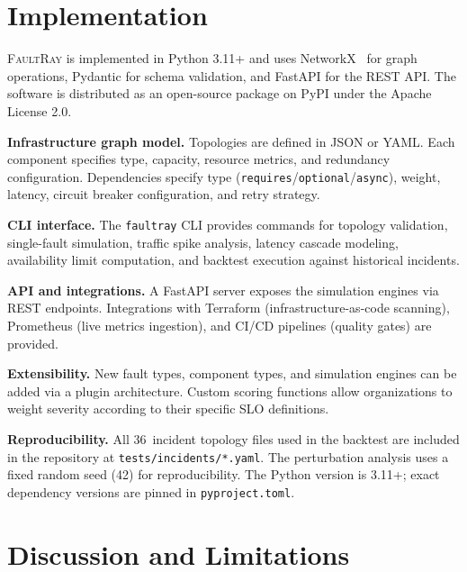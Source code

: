 \documentclass[10pt,twocolumn]{article}
\begin{document}
\section{Implementation}\label{sec:impl}

\textsc{FaultRay} is implemented in Python 3.11+ and uses NetworkX~\cite{networkx}
for graph operations, Pydantic for schema validation, and FastAPI for
the REST API.  The software is distributed as an open-source package on
PyPI under the Apache License 2.0.

\textbf{Infrastructure graph model.}
Topologies are defined in JSON or YAML.  Each component specifies type,
capacity, resource metrics, and redundancy configuration.
Dependencies specify type
(\texttt{requires}/\texttt{optional}/\texttt{async}), weight, latency,
circuit breaker configuration, and retry strategy.

\textbf{CLI interface.}
The \texttt{faultray} CLI provides commands for topology validation,
single-fault simulation, traffic spike analysis, latency cascade
modeling, availability limit computation, and backtest execution against
historical incidents.

\textbf{API and integrations.}
A FastAPI server exposes the simulation engines via REST endpoints.
Integrations with Terraform (infrastructure-as-code scanning),
Prometheus (live metrics ingestion), and CI/CD pipelines (quality gates)
are provided.

\textbf{Extensibility.}
New fault types, component types, and simulation engines can be
added via a plugin architecture.  Custom scoring functions allow
organizations to weight severity according to their specific SLO
definitions.

\textbf{Reproducibility.}
All 36~incident topology files used in the backtest are included
in the repository at \texttt{tests/incidents/*.yaml}. The
perturbation analysis uses a fixed random seed (42) for
reproducibility. The Python version is 3.11+; exact dependency
versions are pinned in \texttt{pyproject.toml}.

\section{Discussion and Limitations}\label{sec:discussion}
\end{document}
